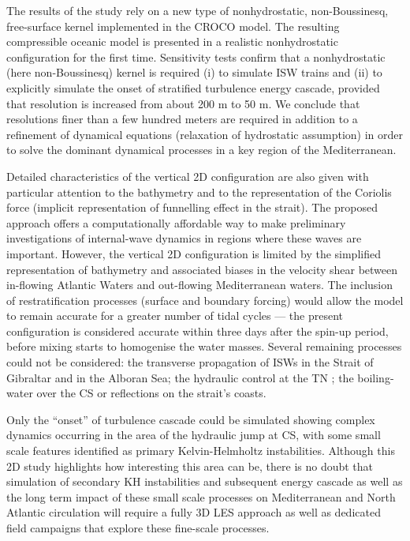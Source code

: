 The results of the study rely on a new type of nonhydrostatic, non-Boussinesq, free-surface kernel \citep{Auclair2018} implemented in the CROCO model. The resulting compressible oceanic model is presented in a realistic nonhydrostatic configuration for the first time. Sensitivity tests confirm that a nonhydrostatic (here non-Boussinesq) kernel is required (i) to simulate ISW trains and (ii) to explicitly simulate the onset of stratified turbulence energy cascade, provided that resolution is increased from about 200 m to 50 m. We conclude that resolutions finer than a few hundred meters are required in addition to a refinement of dynamical equations (relaxation of hydrostatic assumption) in order to solve the dominant dynamical processes in a key region of the Mediterranean.

Detailed characteristics of the vertical 2D configuration are also given with particular attention to the bathymetry and to the representation of the Coriolis force (implicit representation of funnelling effect in the strait). The proposed approach offers a computationally affordable way to make preliminary investigations of internal-wave dynamics in regions where these waves are important. However, the vertical 2D configuration is limited by the simplified representation of bathymetry and associated biases in the velocity shear between in-flowing Atlantic Waters and out-flowing Mediterranean waters. The inclusion of restratification processes (surface and boundary forcing) would allow the model to remain accurate for a greater number of tidal cycles --- the present configuration is considered accurate within three days after the spin-up period, before mixing starts to homogenise the water masses. Several remaining processes could not be considered: the transverse propagation of ISWs in the Strait of Gibraltar \citep{SG2011, Vlasenko2009} and in the Alboran Sea; the hydraulic control at the TN \citep{FA1988, Sannino2009b}; the boiling-water over the CS \citep{Bruno2002} or reflections on the strait's coasts. 

Only the ``onset'' of turbulence cascade could be simulated showing complex dynamics occurring in the area of the hydraulic jump at CS, with some small scale features identified as primary Kelvin-Helmholtz instabilities. Although this 2D study highlights how interesting this area can be, there is no doubt that simulation of secondary KH instabilities and subsequent energy cascade as well as the long term impact of these small scale processes on Mediterranean and North Atlantic circulation will require a fully 3D LES approach as well as dedicated field campaigns that explore these fine-scale processes.


